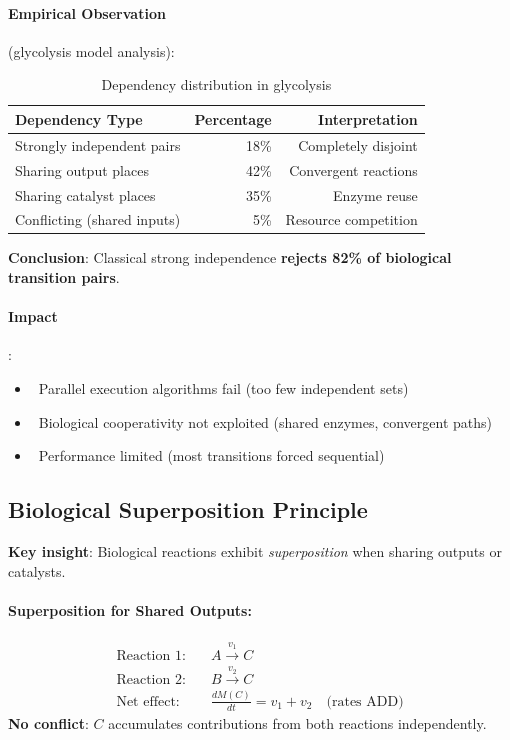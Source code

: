 \paragraph{Empirical Observation} (glycolysis model analysis):
\begin{table}[htbp]
\centering
\caption{Dependency distribution in glycolysis}
\label{tab:glycolysis-dependencies}
\begin{tabular}{lrr}
\toprule
\textbf{Dependency Type} & \textbf{Percentage} & \textbf{Interpretation} \\
\midrule
Strongly independent pairs & 18\% & Completely disjoint \\
Sharing output places & 42\% & Convergent reactions \\
Sharing catalyst places & 35\% & Enzyme reuse \\
Conflicting (shared inputs) & 5\% & Resource competition \\
\bottomrule
\end{tabular}
\end{table}

\noindent\textbf{Conclusion}: Classical strong independence \textbf{rejects 82\% of biological transition pairs}.

\paragraph{Impact}:
\begin{itemize}
    \item \texttimes\ Parallel execution algorithms fail (too few independent sets)
    \item \texttimes\ Biological cooperativity not exploited (shared enzymes, convergent paths)
    \item \texttimes\ Performance limited (most transitions forced sequential)
\end{itemize}

\subsection{Biological Superposition Principle}
\label{subsec:superposition-principle}

\textbf{Key insight}: Biological reactions exhibit \emph{superposition} when sharing outputs or catalysts.

\paragraph{Superposition for Shared Outputs:}
%
\begin{align}
\text{Reaction 1:} & \quad A \xrightarrow{v_1} C \\
\text{Reaction 2:} & \quad B \xrightarrow{v_2} C \\
\text{Net effect:} & \quad \frac{dM(C)}{dt} = v_1 + v_2 \quad \text{(rates ADD)}
\end{align}
%
\textbf{No conflict}: $C$ accumulates contributions from both reactions independently.

